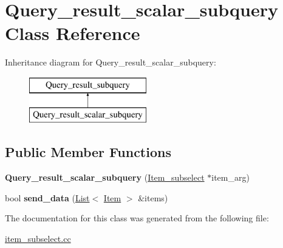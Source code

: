 \hypertarget{classQuery__result__scalar__subquery}{}\section{Query\+\_\+result\+\_\+scalar\+\_\+subquery Class Reference}
\label{classQuery__result__scalar__subquery}
Inheritance diagram for Query\+\_\+result\+\_\+scalar\+\_\+subquery\+:\begin{figure}[H]
\begin{center}
\leavevmode
\includegraphics[height=2.000000cm]{classQuery__result__scalar__subquery}
\end{center}
\end{figure}
\subsection*{Public Member Functions}
\begin{DoxyCompactItemize}
\item 
\mbox{\label{classQuery__result__scalar__subquery_a9656e193a1442c495aa6e9f063476a3e}} 
{\bfseries Query\+\_\+result\+\_\+scalar\+\_\+subquery} (\mbox{\hyperlink{classItem__subselect}{Item\+\_\+subselect}} $\ast$item\+\_\+arg)
\item 
\mbox{\label{classQuery__result__scalar__subquery_afcc19713d616bd5db6d23f39921d1762}} 
bool {\bfseries send\+\_\+data} (\mbox{\hyperlink{classList}{List}}$<$ \mbox{\hyperlink{classItem}{Item}} $>$ \&items)
\end{DoxyCompactItemize}


The documentation for this class was generated from the following file\+:\begin{DoxyCompactItemize}
\item 
\mbox{\hyperlink{item__subselect_8cc}{item\+\_\+subselect.\+cc}}\end{DoxyCompactItemize}
